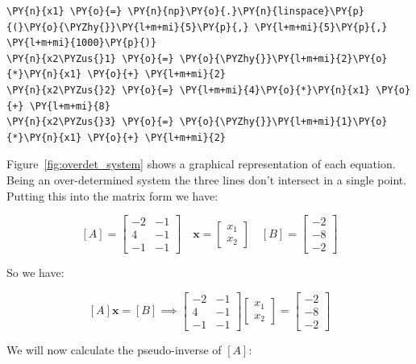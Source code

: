 \begin{tcolorbox}[breakable, size=fbox, boxrule=1pt, pad at break*=1mm,colback=cellbackground, colframe=cellborder]
\begin{Verbatim}[commandchars=\\\{\}]
\PY{n}{x1} \PY{o}{=} \PY{n}{np}\PY{o}{.}\PY{n}{linspace}\PY{p}{(}\PY{o}{\PYZhy{}}\PY{l+m+mi}{5}\PY{p}{,} \PY{l+m+mi}{5}\PY{p}{,} \PY{l+m+mi}{1000}\PY{p}{)}
\PY{n}{x2\PYZus{}1} \PY{o}{=} \PY{o}{\PYZhy{}}\PY{l+m+mi}{2}\PY{o}{*}\PY{n}{x1} \PY{o}{+} \PY{l+m+mi}{2}
\PY{n}{x2\PYZus{}2} \PY{o}{=} \PY{l+m+mi}{4}\PY{o}{*}\PY{n}{x1} \PY{o}{+} \PY{l+m+mi}{8}
\PY{n}{x2\PYZus{}3} \PY{o}{=} \PY{o}{\PYZhy{}}\PY{l+m+mi}{1}\PY{o}{*}\PY{n}{x1} \PY{o}{+} \PY{l+m+mi}{2}
\end{Verbatim}
\end{tcolorbox}

Figure~\ref{fig:overdet_system} shows a graphical representation of each
equation. Being an over-determined system the three lines don't intersect
in a single point.
Putting this into the matrix form we have:

\[[A]=\begin{bmatrix}
−2&-1\\
4&-1\\
−1&−1\end{bmatrix}\quad 
\mathbf{x}=\begin{bmatrix}
x_1\\
x_2\end{bmatrix}\quad
[B]=\begin{bmatrix}
−2\\
−8\\
−2\end{bmatrix}\]

So we have:

\[[A]\mathbf{x}=[B]\implies 
\begin{bmatrix}
−2&-1\\
4&-1\\
−1&−1\end{bmatrix}
\begin{bmatrix}
x_1\\
x_2\end{bmatrix}=
\begin{bmatrix}
−2\\
−8\\
−2\end{bmatrix}\]

We will now calculate the pseudo-inverse of \([A]\):


